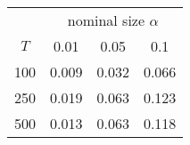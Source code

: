 % 
\begin{tabular}{cccc}
  \hline
  & \multicolumn{3}{c}{nominal size $\alpha$} \\
 $T$ & 0.01 & 0.05 & 0.1 \\
 \hline
100 & 0.009 & 0.032 & 0.066 \\ 
  250 & 0.019 & 0.063 & 0.123 \\ 
  500 & 0.013 & 0.063 & 0.118 \\ 
   \hline
\end{tabular}
